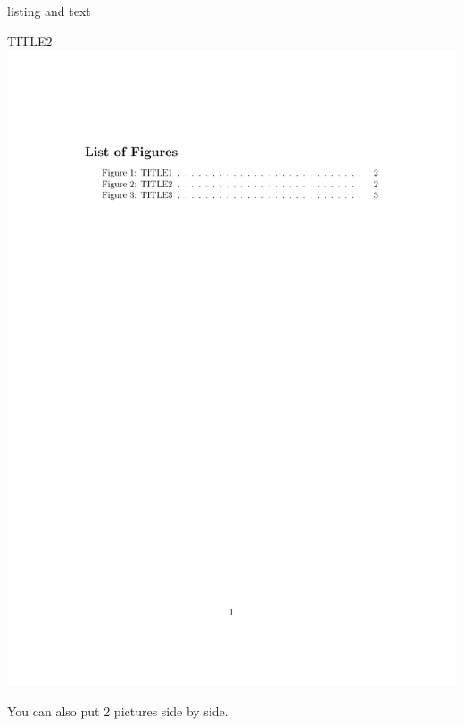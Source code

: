 \documentclass[]{myHOWTO-V001}
\begin{document}
\begin{myTEXEXdoclst}{}{listing and text}
\centering
\begin{myFIGlst}{TITLE2}{}
	\includegraphics[page=2, scale=0.22, trim=20mm 20mm 20mm 20mm, clip]{myFIGV000.pdf}
\end{myFIGlst}
\end{myTEXEXdoclst}

\newpage

You can also put 2 pictures side by side.
\end{document}

